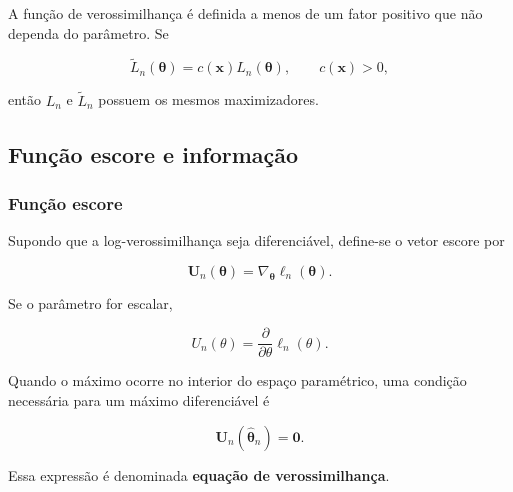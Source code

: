 \documentclass[
  letterpaper,
  DIV=11,
  numbers=noendperiod]{scrreprt}
\begin{document}
\begin{tcolorbox}[enhanced jigsaw, colback=white, leftrule=.75mm, colbacktitle=quarto-callout-note-color!10!white, breakable, titlerule=0mm, bottomtitle=1mm, title=\textcolor{quarto-callout-note-color}{\faInfo}\hspace{0.5em}{Observação}, colframe=quarto-callout-note-color-frame, toprule=.15mm, opacityback=0, bottomrule=.15mm, opacitybacktitle=0.6, arc=.35mm, toptitle=1mm, rightrule=.15mm, coltitle=black, left=2mm]

A função de verossimilhança é definida a menos de um fator positivo que
não dependa do parâmetro. Se

\[\widetilde L_n(\boldsymbol\theta)
=
c(\mathbf{x})L_n(\boldsymbol\theta),
\qquad c(\mathbf{x})>0,\]

então \(L_n\) e \(\widetilde L_n\) possuem os mesmos maximizadores.

\end{tcolorbox}

\subsection{Função escore e
informação}\label{funuxe7uxe3o-escore-e-informauxe7uxe3o}

\subsubsection{Função escore}\label{funuxe7uxe3o-escore}

Supondo que a log-verossimilhança seja diferenciável, define-se o vetor
escore por

\[\mathbf{U}_n(\boldsymbol\theta)
=
\nabla_{\boldsymbol\theta}
\ell_n(\boldsymbol\theta).\]

Se o parâmetro for escalar,

\[U_n(\theta)
=
\frac{\partial}{\partial\theta}
\ell_n(\theta).\]

Quando o máximo ocorre no interior do espaço paramétrico, uma condição
necessária para um máximo diferenciável é

\[\mathbf{U}_n
\left(
\widehat{\boldsymbol\theta}_n
\right)
=
\mathbf{0}.\]

Essa expressão é denominada \textbf{equação de verossimilhança}.
\end{document}
